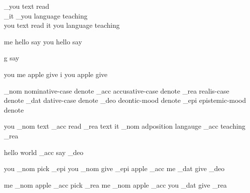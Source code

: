 _you text read \\
_it _you language teaching \\
you text read
it you language teaching

me hello say
you hello say

g say

you me apple give
i you apple give

_nom nominative-case denote
_acc accusative-case denote
_rea realis-case denote
_dat dative-case denote
_deo deontic-mood denote
_epi epistemic-mood denote

you _nom text _acc read _rea
text it _nom adposition langauge _acc teaching _rea

hello world _acc say _deo

you _nom pick _epi
you _nom give _epi
apple _acc me _dat give _deo

me _nom apple _acc pick _rea
me _nom apple _acc you _dat give _rea
